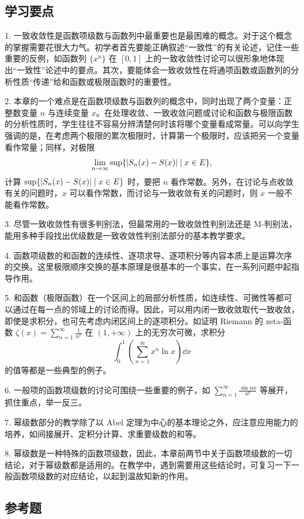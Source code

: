 \subsection{学习要点}

1. 一致收敛性是函数项级数与函数列中最重要也是最困难的概念。对于这个概念的掌握需要花很大力气。初学者首先要能正确叙述“一致性”的有关论述，记住一些重要的反例，如函数列 $\{x^n\}$ 在 $[0,1]$ 上的一致收敛性讨论可以很形象地体现出“一致性”论述中的要点。其次，要能体会一致收敛性在将通项函数或函数列的分析性质“传递”给和函数或极限函数时的重要性。

2. 本章的一个难点是在函数项级数与函数列的概念中，同时出现了两个变量：正整数变量 $n$ 与连续变量 $x$。在处理收敛、一致收敛问题或讨论和函数与极限函数的分析性质时，学生往往不容易分辨清楚何时该将哪个变量看成常量。可以向学生强调的是，在考虑两个极限的累次极限时，计算第一个极限时，应该把另一个变量看作常量；同样，对极限
\[
  \lim_{n\to\infty}\sup\{\lvert S_n(x)-S(x)\rvert\mid x\in E\},
\]
计算 $\sup\{\lvert S_n(x)-S(x)\rvert\mid x\in E\}$ 时，要把 $n$ 看作常数。另外，在讨论与点收敛有关的问题时，$x$ 可以看作常数，而讨论与一致收敛有关的问题时，则 $x$ 一般不能看作常数。

3. 尽管一致收敛性有很多判别法，但最常用的一致收敛性判别法还是 M-判别法，能用多种手段找出优级数是一致收敛性判别法部分的基本教学要求。

4. 函数项级数的和函数的连续性、逐项求导、逐项积分等内容本质上是运算次序的交换。这里极限顺序交换的基本原理是很基本的一个事实，在一系列问题中起指导作用。

5. 和函数（极限函数）在一个区间上的局部分析性质，如连续性、可微性等都可以通过在每一点的邻域上的讨论而得。因此，可以用内闭一致收敛取代一致收敛，即使是求积分，也可先考虑内闭区间上的逐项积分。如证明 Riemann 的 zeta-函数 $\displaystyle\zeta(x)=\sum_{n=1}^{\infty}\frac1{n^x}$ 在 $(1,+\infty)$ 上的无穷次可微，求积分
\[
  \int_0^1\left(\sum_{n=1}^{\infty}x^n\ln x\right)\dd x
\]
的值等都是一些典型的例子。

6. 一般项的函数项级数的讨论可围绕一些重要的例子，如 $\displaystyle\sum_{n=1}^{\infty}\frac{\sin nx}{n^p}$ 等展开，抓住重点，举一反三。

7. 幂级数部分的教学除了以 Abel 定理为中心的基本理论之外，应注意应用能力的培养，如间接展开、定积分计算、求重要级数的和等。

8. 幂级数是一种特殊的函数项级数，因此，本章前两节中关于函数项级数的一切结论，对于幂级数都是适用的。在教学中，遇到需要用这些结论时，可复习一下一般函数项级数的对应结论，以起到温故知新的作用。

\subsection{参考题}

